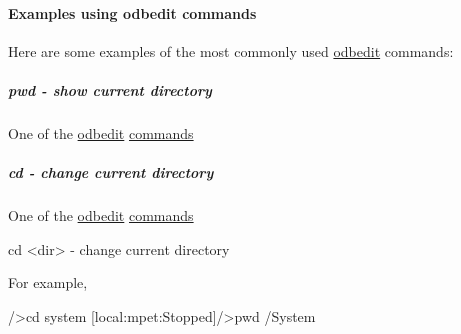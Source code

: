 \hypertarget{RC_odbedit_examples_RC_odbedit_cmd_examples}{}\paragraph{Examples using odbedit commands}\label{RC_odbedit_examples_RC_odbedit_cmd_examples}
Here are some examples of the most commonly used \hyperlink{RC_odbedit_utility}{odbedit} commands:\hypertarget{RC_odbedit_examples_RC_odbedit_pwd}{}\subparagraph{pwd -\/ show current directory}\label{RC_odbedit_examples_RC_odbedit_pwd}

\footnotesize  One of the \hyperlink{RC_odbedit_utility}{odbedit} \hyperlink{RC_odbedit_utility_RC_odbedit_help}{commands} 
\normalsize \par
\par
 




\hypertarget{RC_odbedit_examples_RC_odbedit_cd}{}\subparagraph{cd -\/ change current directory}\label{RC_odbedit_examples_RC_odbedit_cd}

\footnotesize  One of the \hyperlink{RC_odbedit_utility}{odbedit} \hyperlink{RC_odbedit_utility_RC_odbedit_help}{commands} 
\normalsize \par
\par



\begin{DoxyCode}
cd <dir>                - change current directory
\end{DoxyCode}
 For example, 
\begin{DoxyCode}
/>cd system
[local:mpet:Stopped]/>pwd
/System
\end{DoxyCode}




